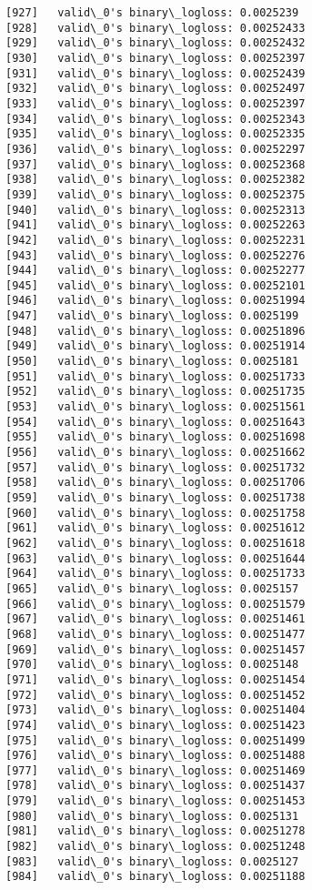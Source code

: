 \documentclass[11pt]{article}
\begin{document}
\begin{Verbatim}[commandchars=\\\{\}]
[927]	valid\_0's binary\_logloss: 0.0025239
[928]	valid\_0's binary\_logloss: 0.00252433
[929]	valid\_0's binary\_logloss: 0.00252432
[930]	valid\_0's binary\_logloss: 0.00252397
[931]	valid\_0's binary\_logloss: 0.00252439
[932]	valid\_0's binary\_logloss: 0.00252497
[933]	valid\_0's binary\_logloss: 0.00252397
[934]	valid\_0's binary\_logloss: 0.00252343
[935]	valid\_0's binary\_logloss: 0.00252335
[936]	valid\_0's binary\_logloss: 0.00252297
[937]	valid\_0's binary\_logloss: 0.00252368
[938]	valid\_0's binary\_logloss: 0.00252382
[939]	valid\_0's binary\_logloss: 0.00252375
[940]	valid\_0's binary\_logloss: 0.00252313
[941]	valid\_0's binary\_logloss: 0.00252263
[942]	valid\_0's binary\_logloss: 0.00252231
[943]	valid\_0's binary\_logloss: 0.00252276
[944]	valid\_0's binary\_logloss: 0.00252277
[945]	valid\_0's binary\_logloss: 0.00252101
[946]	valid\_0's binary\_logloss: 0.00251994
[947]	valid\_0's binary\_logloss: 0.0025199
[948]	valid\_0's binary\_logloss: 0.00251896
[949]	valid\_0's binary\_logloss: 0.00251914
[950]	valid\_0's binary\_logloss: 0.0025181
[951]	valid\_0's binary\_logloss: 0.00251733
[952]	valid\_0's binary\_logloss: 0.00251735
[953]	valid\_0's binary\_logloss: 0.00251561
[954]	valid\_0's binary\_logloss: 0.00251643
[955]	valid\_0's binary\_logloss: 0.00251698
[956]	valid\_0's binary\_logloss: 0.00251662
[957]	valid\_0's binary\_logloss: 0.00251732
[958]	valid\_0's binary\_logloss: 0.00251706
[959]	valid\_0's binary\_logloss: 0.00251738
[960]	valid\_0's binary\_logloss: 0.00251758
[961]	valid\_0's binary\_logloss: 0.00251612
[962]	valid\_0's binary\_logloss: 0.00251618
[963]	valid\_0's binary\_logloss: 0.00251644
[964]	valid\_0's binary\_logloss: 0.00251733
[965]	valid\_0's binary\_logloss: 0.0025157
[966]	valid\_0's binary\_logloss: 0.00251579
[967]	valid\_0's binary\_logloss: 0.00251461
[968]	valid\_0's binary\_logloss: 0.00251477
[969]	valid\_0's binary\_logloss: 0.00251457
[970]	valid\_0's binary\_logloss: 0.0025148
[971]	valid\_0's binary\_logloss: 0.00251454
[972]	valid\_0's binary\_logloss: 0.00251452
[973]	valid\_0's binary\_logloss: 0.00251404
[974]	valid\_0's binary\_logloss: 0.00251423
[975]	valid\_0's binary\_logloss: 0.00251499
[976]	valid\_0's binary\_logloss: 0.00251488
[977]	valid\_0's binary\_logloss: 0.00251469
[978]	valid\_0's binary\_logloss: 0.00251437
[979]	valid\_0's binary\_logloss: 0.00251453
[980]	valid\_0's binary\_logloss: 0.0025131
[981]	valid\_0's binary\_logloss: 0.00251278
[982]	valid\_0's binary\_logloss: 0.00251248
[983]	valid\_0's binary\_logloss: 0.0025127
[984]	valid\_0's binary\_logloss: 0.00251188

\end{Verbatim}
\end{document}
